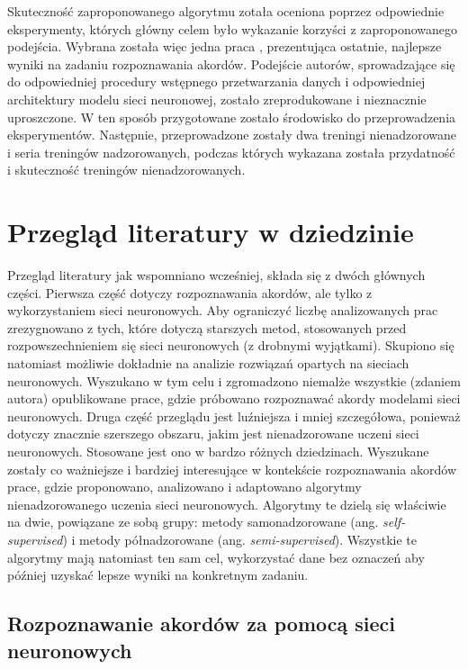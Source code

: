 Skuteczność zaproponowanego algorytmu zotała oceniona poprzez odpowiednie eksperymenty, których główny celem było wykazanie korzyści z zaproponowanego podejścia. Wybrana została więc jedna praca \cite{park_bi-directional_2019}, prezentująca ostatnie, najlepsze wyniki na zadaniu rozpoznawania akordów. Podejście autorów, sprowadzające się do odpowiedniej procedury wstępnego przetwarzania danych i odpowiedniej architektury modelu sieci neuronowej, zostało zreprodukowane i nieznacznie uproszczone. W ten sposób przygotowane zostało środowisko do przeprowadzenia eksperymentów. Następnie, przeprowadzone zostały dwa treningi nienadzorowane i seria treningów nadzorowanych, podczas których wykazana została przydatność i skuteczność treningów nienadzorowanych.



\section{Przegląd literatury w dziedzinie}

Przegląd literatury jak wspomniano wcześniej, składa się z dwóch głównych części. Pierwsza część dotyczy rozpoznawania akordów, ale tylko z wykorzystaniem sieci neuronowych. Aby ograniczyć liczbę analizowanych prac zrezygnowano z tych, które dotyczą starszych metod, stosowanych przed rozpowszechnieniem się sieci neuronowych (z drobnymi wyjątkami). Skupiono się natomiast możliwie dokładnie na analizie rozwiązań opartych na sieciach neuronowych. Wyszukano w tym celu i zgromadzono niemalże wszystkie (zdaniem autora) opublikowane prace, gdzie próbowano rozpoznawać akordy modelami sieci neuronowych. Druga część przeglądu jest luźniejsza i mniej szczegółowa, ponieważ dotyczy znacznie szerszego obszaru, jakim jest nienadzorowane uczeni sieci neuronowych. Stosowane jest ono w bardzo różnych dziedzinach. Wyszukane zostały co ważniejsze i bardziej interesujące w kontekście rozpoznawania akordów prace, gdzie proponowano, analizowano i adaptowano algorytmy nienadzorowanego uczenia sieci neuronowych. Algorytmy te dzielą się właściwie na dwie, powiązane ze sobą grupy: metody samonadzorowane (ang. \emph{self-supervised}) i metody półnadzorowane (ang. \emph{semi-supervised}). Wszystkie te algorytmy mają natomiast ten sam cel, wykorzystać dane bez oznaczeń aby później uzyskać lepsze wyniki na konkretnym zadaniu.

\subsection{Rozpoznawanie akordów za pomocą sieci neuronowych}

